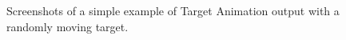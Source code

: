 \documentclass[a4paper,11pt]{article}
\begin{document}
\begin{figure}[H]
\begin{minipage}{0.2\textwidth}
\end{minipage}
\begin{minipage}{0.2\textwidth}
\end{minipage}
\begin{minipage}{0.2\textwidth}
\end{minipage}
\caption{Screenshots of a simple example of Target Animation output with a randomly moving target.}
\label{target_animation_example}
\end{figure}
\end{document}
